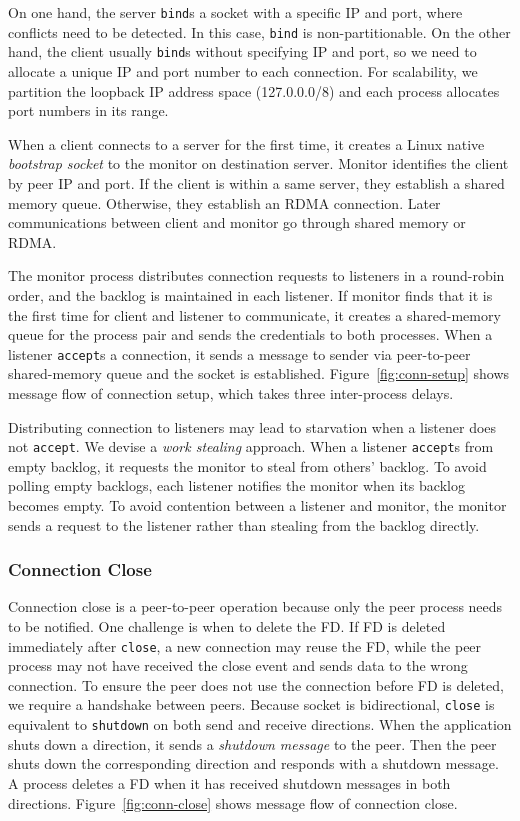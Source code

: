 On one hand, the server \texttt{bind}s a socket with a specific IP and port, where conflicts need to be detected. In this case, \texttt{bind} is non-partitionable.
On the other hand, the client usually \texttt{bind}s without specifying IP and port, so we need to allocate a unique IP and port number to each connection. For scalability, we partition the loopback IP address space (127.0.0.0/8) and each process allocates port numbers in its range.

When a client connects to a server for the first time, it creates a Linux native \textit{bootstrap socket} to the monitor on destination server. Monitor identifies the client by peer IP and port. If the client is within a same server, they establish a shared memory queue. Otherwise, they establish an RDMA connection. Later communications between client and monitor go through shared memory or RDMA.

The monitor process distributes connection requests to listeners in a round-robin order, and the backlog is maintained in each listener. If monitor finds that it is the first time for client and listener to communicate, it creates a shared-memory queue for the process pair and sends the credentials to both processes. When a listener \texttt{accept}s a connection, it sends a message to sender via peer-to-peer shared-memory queue and the socket is established. Figure~\ref{fig:conn-setup} shows message flow of connection setup, which takes three inter-process delays.

Distributing connection to listeners may lead to starvation when a listener does not \texttt{accept}. We devise a \textit{work stealing} approach. When a listener \texttt{accept}s from empty backlog, it requests the monitor to steal from others' backlog. To avoid polling empty backlogs, each listener notifies the monitor when its backlog becomes empty. To avoid contention between a listener and monitor, the monitor sends a request to the listener rather than stealing from the backlog directly.

\subsubsection{Connection Close}

Connection close is a peer-to-peer operation because only the peer process needs to be notified. One challenge is when to delete the FD. If FD is deleted immediately after \texttt{close}, a new connection may reuse the FD, while the peer process may not have received the close event and sends data to the wrong connection. To ensure the peer does not use the connection before FD is deleted, we require a handshake between peers.
Because socket is bidirectional, \texttt{close} is equivalent to \texttt{shutdown} on both send and receive directions. When the application shuts down a direction, it sends a \textit{shutdown message} to the peer. Then the peer shuts down the corresponding direction and responds with a shutdown message. A process deletes a FD when it has received shutdown messages in both directions. Figure~\ref{fig:conn-close} shows message flow of connection close.


